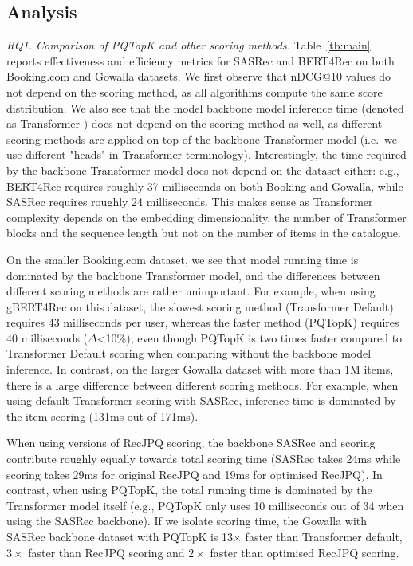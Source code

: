 \documentclass[sigconf,natbib=true, review=true]{acmart} %
\newcommand{\rsasha}[1]{\textcolor[HTML]{FF0000}{#1}}
\begin{document}
\subsection{Analysis}
\textit{RQ1. Comparison of PQTopK and other scoring methods.} Table~\ref{tb:main} reports effectiveness and efficiency metrics for SASRec and BERT4Rec on both Booking.com and Gowalla datasets. We first observe that nDCG@10 values do not depend on the scoring method, as all algorithms compute the same score distribution. We also see that \rsasha{the model backbone model inference time (denoted as Transformer )} does not depend on the scoring method as well, as different scoring methods are applied on top of the backbone Transformer model (i.e.\ we use different "heads" in Transformer terminology). Interestingly, the time required by the backbone Transformer model does not depend on the dataset either: e.g., BERT4Rec requires roughly 37 milliseconds on both Booking and Gowalla, while SASRec requires roughly 24 milliseconds. This makes sense as Transformer complexity depends on the embedding dimensionality, the number of Transformer blocks and the sequence length but not on the number of items in the catalogue.

On the smaller Booking.com dataset, we see that model running time is dominated by the backbone Transformer model, and the differences between different scoring methods are rather unimportant. For example, when using gBERT4Rec on this dataset, the slowest scoring method (Transformer Default) requires 43 milliseconds per user, whereas the faster method (PQTopK) requires 40 milliseconds ($\Delta$<10\%); \rsasha{even though PQTopK is two times faster compared to Transformer Default scoring when comparing without the backbone model inference.}  In contrast, on the larger Gowalla dataset with more than 1M items, there is a large difference between different scoring methods. For example, when using default Transformer scoring with SASRec, inference time is dominated by the item scoring (131ms out of 171ms). 

When using versions of RecJPQ scoring,  the backbone SASRec and scoring contribute roughly equally towards total scoring time (SASRec takes 24ms while scoring takes 29ms for original RecJPQ and 19ms for optimised RecJPQ). \rsasha{In contrast}, when using PQTopK, the total running time \rsasha{is dominated by} the Transformer model itself (e.g., PQTopK only uses 10 milliseconds out of 34 when using the SASRec backbone). If we isolate scoring time, the Gowalla with SASRec backbone dataset with  PQTopK is 13$\times$ faster than Transformer default, $3\times$ faster than RecJPQ scoring and $2\times$ faster than optimised RecJPQ scoring.
\end{document}
